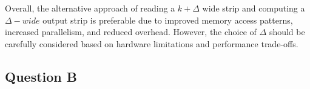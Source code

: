 Overall, the alternative approach of reading a $k + \Delta$ wide strip and computing a $\Delta-wide$ output strip is preferable due to improved memory access patterns, increased parallelism, and reduced overhead. However, the choice of $\Delta$ should be carefully considered based on hardware limitations and performance trade-offs.
\vspace{3mm}

\subsection{Question B}

